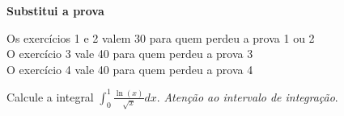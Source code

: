 \documentclass[a4paper,12pt,fleqn]{article}
\begin{document}

\vspace{\baselineskip}
\textbf{Substitui a prova} \underline{\hspace{20mm}}
\vspace{\baselineskip}

Os exercícios 1 e 2 valem 30 para quem perdeu a prova 1 ou 2 \\[-1mm]
O exercício 3 vale 40 para quem perdeu a prova 3 \\[-1mm]
O exercício 4 vale 40 para quem perdeu a prova 4

\vspace{\baselineskip}
Calcule a integral \(\int_0^1 \frac{\ln(x)}{\sqrt{x}} dx\).
\textit{Atenção ao intervalo de integração}.
\end{document}
